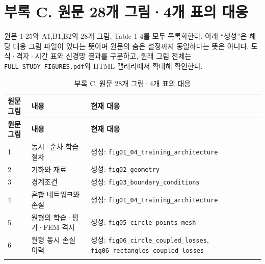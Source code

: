 \documentclass[10pt,a4paper]{article}
\renewcommand{\arraystretch}{1.25}
\begin{document}
\clearpage

\section{부록 C. 원문 28개 그림·4개 표의 대응}

원문 1-25와 A1,B1,B2의 28개 그림, Table 1-4를 모두 목록화한다. 아래 “생성”은 해당 대응 그림 파일이 있다는 뜻이며 원문의 숨은 설정까지 동일하다는 뜻은 아니다. 도식·격자·시간 표와 신경망 결과를 구분하고, 원래 그림 전체는 \nolinkurl{FULL_STUDY_FIGURES.pdf}와 HTML 갤러리에서 확대해 확인한다.\par

\begingroup\fontsize{8}{10.5}\selectfont\renewcommand{\arraystretch}{1.1}

\begin{longtable}{>{\raggedright\arraybackslash}p{}>{\raggedright\arraybackslash}p{}>{\raggedright\arraybackslash}p{}}

\caption{부록 C. 원문 28개 그림·4개 표의 대응}\\

\rowcolor{tint} \textbf{원문 그림} & \textbf{내용} & \textbf{현재 대응}\\\midrule\endfirsthead

\rowcolor{tint} \textbf{원문 그림} & \textbf{내용} & \textbf{현재 대응}\\\midrule\endhead

\bottomrule\endfoot

1 & 동시·순차 학습 절차 & 생성: \nolinkurl{fig01_04_training_architecture}\\\addlinespace[1pt]

2 & 기하와 재료 & 생성: \nolinkurl{fig02_geometry}\\\addlinespace[1pt]

3 & 경계조건 & 생성: \nolinkurl{fig03_boundary_conditions}\\\addlinespace[1pt]

4 & 혼합 네트워크와 손실 & 생성: \nolinkurl{fig01_04_training_architecture}\\\addlinespace[1pt]

5 & 원형의 학습·평가·FEM 격자 & 생성: \nolinkurl{fig05_circle_points_mesh}\\\addlinespace[1pt]

6 & 원형 동시 손실 이력 & 생성: \nolinkurl{fig06_circle_coupled_losses}, \nolinkurl{fig06_rectangles_coupled_losses}\\\addlinespace[1pt]


\end{longtable}
\end{document}
